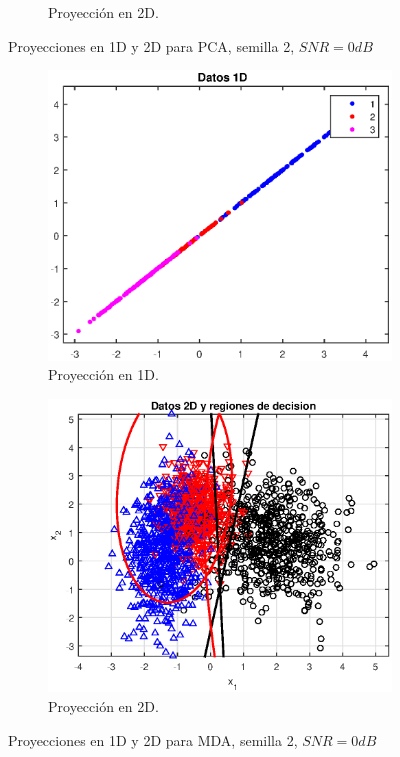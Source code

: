 \documentclass[11pt]{article} %
\begin{document}
\begin{figure}[h]
\begin{subfigure}[b]{0.435\textwidth}
		\caption[]{\small Proyección en 2D.}
		\label{fig:select:0dB:pca:scatter:2D}
	\end{subfigure}
	\caption{Proyecciones en 1D y 2D para PCA, semilla 2, $SNR=0dB$}
	\label{fig:select:0dB:pca:scatter}
\end{figure}

\begin{figure}[h]
	\centering
	\begin{subfigure}[b]{0.435\textwidth}
		\includegraphics[width=\textwidth]{../21_seleccion/3_mda_0dB_1d.eps}
		\caption[]{\small Proyección en 1D.}
		\label{fig:select:0dB:mda:scatter:1D}
	\end{subfigure}
	\quad
	\begin{subfigure}[b]{0.435\textwidth}
		\includegraphics[width=\textwidth]{../21_seleccion/3_mda_0dB_2d.eps}
		\caption[]{\small Proyección en 2D.}
		\label{fig:select:0dB:mda:scatter:2D}
	\end{subfigure}
	\caption{Proyecciones en 1D y 2D para MDA, semilla 2, $SNR=0dB$}
	\label{fig:select:0dB:mda:scatter}
\end{figure}
\end{document}
